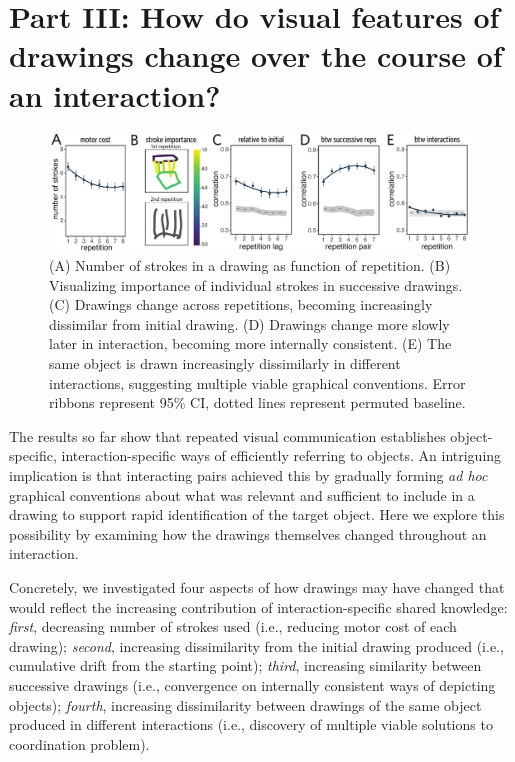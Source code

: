 \documentclass[10pt,letterpaper]{article}
\begin{document}
\section{Part III: How do visual features of drawings change over the course of an interaction?}

\begin{figure}
\includegraphics[width=0.98\linewidth]{figures/drawing_changes.pdf}
\caption{(A) Number of strokes in a drawing as function of repetition. (B) Visualizing importance of individual strokes in successive drawings. (C) Drawings change across repetitions, becoming increasingly dissimilar from initial drawing. (D) Drawings change more slowly later in interaction, becoming more internally consistent. (E) The same object is drawn increasingly dissimilarly in different interactions, suggesting multiple viable graphical conventions. Error ribbons represent 95\% CI, dotted lines represent permuted baseline.}
\label{within-across}
\end{figure}

The results so far show that repeated visual communication establishes object-specific, interaction-specific ways of efficiently referring to objects.
An intriguing implication is that interacting pairs achieved this by gradually forming \textit{ad hoc} graphical conventions about what was relevant and sufficient to include in a drawing to support rapid identification of the target object. 
Here we explore this possibility by examining how the drawings themselves changed throughout an interaction.

Concretely, we investigated four aspects of how drawings may have changed that would reflect the increasing contribution of interaction-specific shared knowledge: \textit{first}, decreasing number of strokes used (i.e., reducing motor cost of each drawing); \textit{second}, increasing dissimilarity from the initial drawing produced (i.e., cumulative drift from the starting point); \textit{third}, increasing similarity between successive drawings (i.e., convergence on internally consistent ways of depicting objects); \textit{fourth}, increasing dissimilarity between drawings of the same object produced in different interactions (i.e., discovery of multiple viable solutions to coordination problem). 
\end{document}
